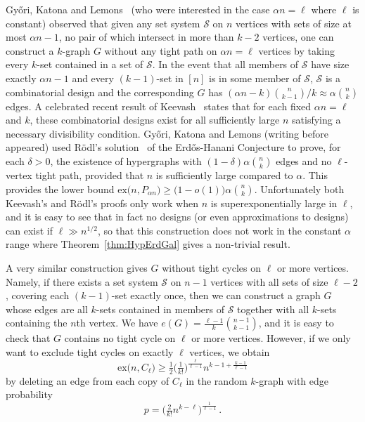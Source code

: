 \documentclass[12pt,a4paper]{amsart}
\newcommand{\cS}{\mathcal{S}}
\newcommand{\ex}{\mathrm{ex}}
\begin{document}
Gy\H{o}ri, Katona and Lemons~\cite{GyKatLem} (who were interested in the case
$\alpha n=\ell$ where $\ell$ is constant) observed that
given any set system $\cS$ on $n$ vertices with sets of size at most $\alpha n-1$, no pair of which intersect in more than $k-2$ vertices, one can construct a $k$-graph $G$ without any tight path on $\alpha n=\ell$
vertices by taking every $k$-set contained in a set of $\cS$. In the event that
all members of $\cS$ have size exactly $\alpha n-1$ and every $(k-1)$-set in $[n]$ is in some member of $\cS$,
$\cS$ is a combinatorial design and the corresponding $G$ has $(\alpha
n-k)\binom{n}{k-1}/k \approx \alpha\binom{n}{k}$ edges. A celebrated recent result of Keevash~\cite{KeeDesign} states that for each fixed $\alpha n=\ell$ and $k$, these combinatorial designs exist for all sufficiently large $n$ satisfying a necessary divisibility condition. Gy\H{o}ri, Katona and Lemons (writing before~\cite{KeeDesign} appeared) used R\"odl's solution~\cite{RodlEH} of the Erd\H{o}s-Hanani
Conjecture to prove, for each $\delta>0$, the existence of hypergraphs with
$(1-\delta)\alpha\binom{n}{k}$ edges and no $\ell$-vertex tight path, provided that $n$ is sufficiently
large compared to $\alpha$. This provides the lower bound $\ex\big(n,P_{\alpha n}\big)\ge\big(1-o(1)\big)\alpha\binom{n}{k}$. Unfortunately both Keevash's and R\"odl's proofs only
work when $n$ is superexponentially large in $\ell$, and it is easy to
see that in fact no designs (or even approximations to designs) can exist if
$\ell\gg n^{1/2}$, so that this construction does not work in the constant $\alpha$ range where
Theorem~\ref{thm:HypErdGal} gives a non-trivial result.

A very similar construction gives $G$ without tight cycles on $\ell$ or
more vertices. Namely, if there exists a set system $\cS$ on $n-1$ vertices
with all sets of size $\ell-2$, covering each $(k-1)$-set exactly once,
then we can construct a graph $G$ whose edges are all $k$-sets contained in
members of $\cS$ together with all $k$-sets containing the $n$th vertex. We
have $e(G)=\frac{\ell-1}{k}\binom{n-1}{k-1}$, and it is easy to check
that $G$ contains no tight cycle on $\ell$ or more vertices. However, if we
only want to exclude tight cycles on exactly $\ell$ vertices, we obtain
\[\ex\big(n,C_\ell\big)\ge
\tfrac12\big(\tfrac{1}{k!}\big)^{\tfrac{\ell}{\ell-1}}n^{k-1+\tfrac{k-1}{\ell-1}}\]
by deleting an edge from each copy of $C_\ell$ in the random $k$-graph with edge probability
\[p=\big(\tfrac{2}{k!}n^{k-\ell}\big)^{\tfrac{1}{\ell-1}}\,.\]
\end{document}
